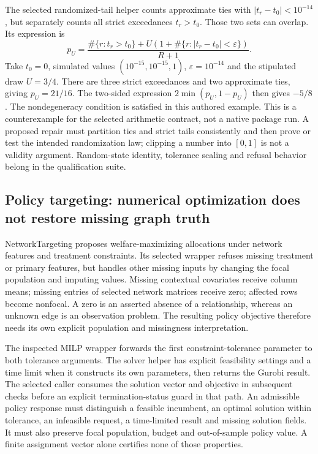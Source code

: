 The selected randomized-tail helper counts approximate ties with $|t_r-t_0|<10^{-14}$, but separately counts all strict exceedances $t_r>t_0$. Those two sets can overlap. Its expression is
\[
 p_U=\frac{\#\{r:t_r>t_0\}+U(1+\#\{r:|t_r-t_0|<\varepsilon\})}{R+1}.
\]
Take $t_0=0$, simulated values $(10^{-15},10^{-15},1)$, $\varepsilon=10^{-14}$ and the stipulated draw $U=3/4$. There are three strict exceedances and two approximate ties, giving $p_U=21/16$. The two-sided expression $2\min(p_U,1-p_U)$ then gives $-5/8$. The nondegeneracy condition is satisfied in this authored example. This is a counterexample for the selected arithmetic contract, not a native package run. A proposed repair must partition ties and strict tails consistently and then prove or test the intended randomization law; clipping a number into $[0,1]$ is not a validity argument. Random-state identity, tolerance scaling and refusal behavior belong in the qualification suite.~\citep{exec25_rnet_biclique,exec25_rnet_choice}

\subsection{Policy targeting: numerical optimization does not restore missing graph truth}

NetworkTargeting proposes welfare-maximizing allocations under network features and treatment constraints. Its selected wrapper refuses missing treatment or primary features, but handles other missing inputs by changing the focal population and imputing values. Missing contextual covariates receive column means; missing entries of selected network matrices receive zero; affected rows become nonfocal. A zero is an asserted absence of a relationship, whereas an unknown edge is an observation problem. The resulting policy objective therefore needs its own explicit population and missingness interpretation.~\citep{exec25_rnet_target}

The inspected MILP wrapper forwards the first constraint-tolerance parameter to both tolerance arguments. The solver helper has explicit feasibility settings and a time limit when it constructs its own parameters, then returns the Gurobi result. The selected caller consumes the solution vector and objective in subsequent checks before an explicit termination-status guard in that path. An admissible policy response must distinguish a feasible incumbent, an optimal solution within tolerance, an infeasible request, a time-limited result and missing solution fields. It must also preserve focal population, budget and out-of-sample policy value. A finite assignment vector alone certifies none of those properties.~\citep{exec25_rnet_target}

